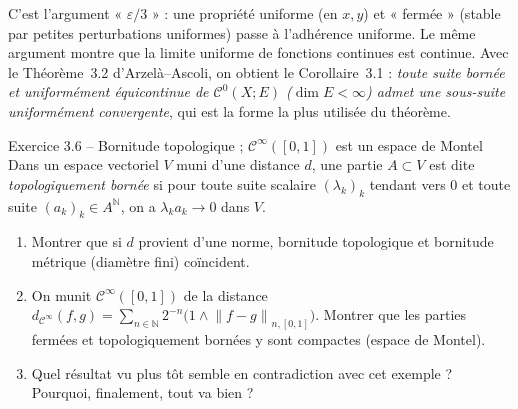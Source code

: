 \documentclass[11pt,a4paper]{article}
\newcommand{\N}{\mathbb{N}}
\newcommand{\norm}[1]{\left\|#1\right\|}
\newcommand{\Cz}{\mathcal{C}^0}
\newcommand{\Cinf}{\mathcal{C}^\infty}
\theoremstyle{definition}
\begin{document}
\begin{pointcle}
C'est l'argument « $\varepsilon/3$ » : une propriété uniforme (en $x,y$) et « fermée » (stable par petites perturbations uniformes) passe à l'adhérence uniforme. Le même argument montre que la limite uniforme de fonctions continues est continue. Avec le Théorème~3.2 d'Arzelà--Ascoli, on obtient le Corollaire~3.1 : \emph{toute suite bornée et uniformément équicontinue de $\Cz(X;E)$ ($\dim E<\infty$) admet une sous-suite uniformément convergente}, qui est la forme la plus utilisée du théorème.
\end{pointcle}

\begin{exo}{Exercice 3.6 -- Bornitude topologique ; $\Cinf([0,1])$ est un espace de Montel}
Dans un espace vectoriel $V$ muni d'une distance $d$, une partie $A\subset V$ est dite \emph{topologiquement bornée} si pour toute suite scalaire $(\lambda_k)_k$ tendant vers $0$ et toute suite $(a_k)_k\in A^\N$, on a $\lambda_ka_k\to0$ dans $V$.
\begin{enumerate}[label=\arabic*.]
  \item Montrer que si $d$ provient d'une norme, bornitude topologique et bornitude métrique (diamètre fini) coïncident.
  \item On munit $\Cinf([0,1])$ de la distance $d_{\Cinf}(f,g)=\sum_{n\in\N}2^{-n}\big(1\wedge\norm{f-g}_{n,[0,1]}\big)$. Montrer que les parties fermées et topologiquement bornées y sont compactes (espace de Montel).
  \item Quel résultat vu plus tôt semble en contradiction avec cet exemple ? Pourquoi, finalement, tout va bien ?
\end{enumerate}
\end{exo}
\end{document}
